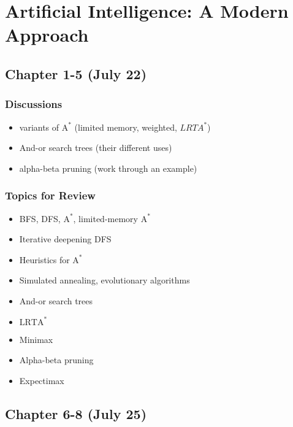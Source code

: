 \section{Artificial Intelligence: A Modern Approach}

\subsection{Chapter 1-5 (July 22)}

\subsubsection*{Discussions}
\begin{itemize}
\item variants of $\text{A}^*$ (limited memory, weighted, $LRTA^*$)
\item And-or search trees (their different uses)
\item alpha-beta pruning (work through an example)
\end{itemize}

\subsubsection*{Topics for Review}
\begin{itemize}
\item BFS, DFS, $\text{A}^*$, limited-memory $\text{A}^*$
\item Iterative deepening DFS
\item Heuristics for $\text{A}^*$
\item Simulated annealing, evolutionary algorithms
\item And-or search trees
\item $\text{LRTA}^*$
\item Minimax
\item Alpha-beta pruning
\item Expectimax
\end{itemize}

\subsection{Chapter 6-8 (July 25)}
